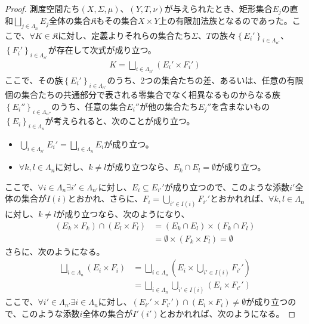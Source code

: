 \documentclass[dvipdfmx]{jsarticle}
\begin{document}
\begin{proof}
測度空間たち$(X,\varSigma,\mu)$、$(Y,T,\nu)$が与えられたとき、矩形集合$E_{j}$の直和$\bigsqcup_{j \in \varLambda_{n}} E_{j}$全体の集合$\mathfrak{K}$もその集合$X \times Y$上の有限加法族となるのであった。ここで、$\forall K \in \mathfrak{K}$に対し、定義よりそれらの集合たち$\varSigma$、$T$の族々$\left\{ E_{i}' \right\}_{i \in \varLambda_{n'}}$、$\left\{ F_{i}' \right\}_{i \in \varLambda_{n'}}$が存在して次式が成り立つ。
\begin{align*}
K = \bigsqcup_{i \in \varLambda_{n'}} \left( E_{i}' \times F_{i}' \right)
\end{align*}
ここで、その族$\left\{ E_{i}' \right\}_{i \in \varLambda_{n'}}$のうち、2つの集合たちの差、あるいは、任意の有限個の集合たちの共通部分で表される零集合でなく相異なるものからなる族$\left\{ E_{i}'' \right\}_{i \in \varLambda_{n''}}$のうち、任意の集合$E_{i}''$が他の集合たち$E_{j}''$を含まないもの$\left\{ E_{i} \right\}_{i \in \varLambda_{n}}$が考えられると、次のことが成り立つ。
\begin{itemize}
\item
  $\bigcup_{i \in \varLambda_{n'}} E_{i}' = \bigsqcup_{i \in \varLambda_{n}} E_{i}$が成り立つ。
\item
  $\forall k,l \in \varLambda_{n}$に対し、$k \neq l$が成り立つなら、$E_{k} \cap E_{l} = \emptyset$が成り立つ。
\end{itemize}
ここで、$\forall i \in \varLambda_{n}\exists i' \in \varLambda_{n'}$に対し、$E_{i} \subseteq E_{i'}'$が成り立つので、このような添数$i'$全体の集合が$I(i)$とおかれ、さらに、$F_{i} = \bigcup_{i' \in I(i)} F_{i'}'$とおかれれば、$\forall k,l \in \varLambda_{n}$に対し、$k \neq l$が成り立つなら、次のようになり、
\begin{align*}
\left( E_{k} \times F_{k} \right) \cap \left( E_{l} \times F_{l} \right) &= \left( E_{k} \cap E_{l} \right) \times \left( F_{k} \cap F_{l} \right)\\
&= \emptyset \times \left( F_{k} \times F_{l} \right) = \emptyset
\end{align*}
さらに、次のようになる。
\begin{align*}
\bigsqcup_{i \in \varLambda_{n}} \left( E_{i} \times F_{i} \right) &= \bigsqcup_{i \in \varLambda_{n}} \left( E_{i} \times \bigcup_{i' \in I(i)} F_{i'}' \right)\\
&= \bigsqcup_{i \in \varLambda_{n}} {\bigcup_{i' \in I(i)} \left( E_{i} \times F_{i'}' \right)}
\end{align*}
ここで、$\forall i' \in \varLambda_{n'}\exists i \in \varLambda_{n}$に対し、$\left( E_{i'}' \times F_{i'}' \right) \cap \left( E_{i} \times F_{i} \right) \neq \emptyset$が成り立つので、このような添数$i$全体の集合が$I'\left( i' \right)$とおかれれば、次のようになる。

\end{proof}
\end{document}
